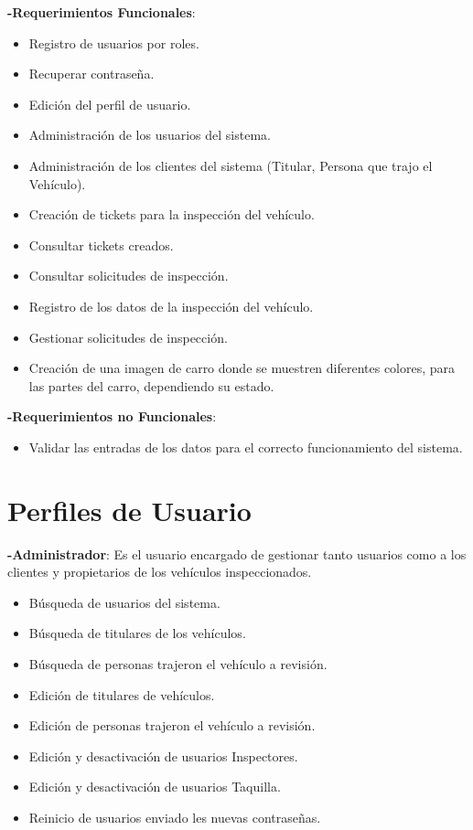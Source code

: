 	\textbf{-Requerimientos Funcionales}: 

	\begin{itemize}
		\item Registro de usuarios por roles.
		\item Recuperar contraseña.
		\item Edición del perfil de usuario.
		\item Administración de los usuarios del sistema.
		\item Administración de los clientes del sistema (Titular, Persona que trajo el Vehículo).
		\item Creación de tickets para la inspección del vehículo.
		\item Consultar tickets creados.
		\item Consultar solicitudes de inspección.
		\item Registro de los datos de la inspección del vehículo.
		\item Gestionar solicitudes de inspección.
		\item Creación de una imagen de carro donde se muestren diferentes colores, para las partes del carro, dependiendo su estado.
	\end{itemize}

	\textbf{-Requerimientos no Funcionales}: 

	\begin{itemize}
		\item Validar las entradas de los datos para el correcto funcionamiento del sistema.
	\end{itemize}

\setlength{\parskip}{0mm}


\section{Perfiles de Usuario} 
\setlength{\parskip}{5mm}

\textbf{-Administrador}: Es el usuario encargado de gestionar tanto usuarios como a los clientes y propietarios de los vehículos inspeccionados.
	\begin{itemize}
		\item Búsqueda de usuarios del sistema.
		\item Búsqueda de titulares de los vehículos.
		\item Búsqueda de personas trajeron el vehículo a revisión. 
		\item Edición de titulares de vehículos.
		\item Edición de personas trajeron el vehículo a revisión.
		\item Edición y desactivación de usuarios Inspectores.
		\item Edición y desactivación de usuarios Taquilla.
		\item Reinicio de usuarios enviado les nuevas contraseñas.
	\end{itemize}

